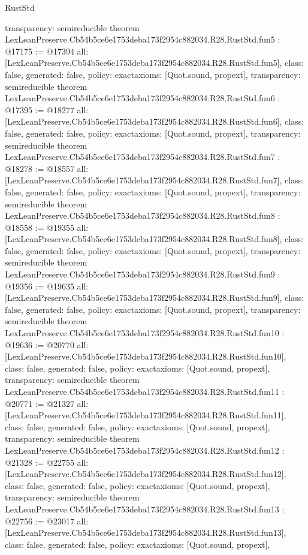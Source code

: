 \begin{lexlean}{RustStd}
\begin{coremodule}
{  transparency: semireducible
}
theorem LexLeanPreserve.Cb54b5ce6e1753deba173f2954c882034.R28.RustStd.fun5 : @17175 := @17394 {
  all: [LexLeanPreserve.Cb54b5ce6e1753deba173f2954c882034.R28.RustStd.fun5],
  class: false,
  generated: false,
  policy: exact{axioms: [Quot.sound, propext]},
  transparency: semireducible
}
theorem LexLeanPreserve.Cb54b5ce6e1753deba173f2954c882034.R28.RustStd.fun6 : @17395 := @18277 {
  all: [LexLeanPreserve.Cb54b5ce6e1753deba173f2954c882034.R28.RustStd.fun6],
  class: false,
  generated: false,
  policy: exact{axioms: [Quot.sound, propext]},
  transparency: semireducible
}
theorem LexLeanPreserve.Cb54b5ce6e1753deba173f2954c882034.R28.RustStd.fun7 : @18278 := @18557 {
  all: [LexLeanPreserve.Cb54b5ce6e1753deba173f2954c882034.R28.RustStd.fun7],
  class: false,
  generated: false,
  policy: exact{axioms: [Quot.sound, propext]},
  transparency: semireducible
}
theorem LexLeanPreserve.Cb54b5ce6e1753deba173f2954c882034.R28.RustStd.fun8 : @18558 := @19355 {
  all: [LexLeanPreserve.Cb54b5ce6e1753deba173f2954c882034.R28.RustStd.fun8],
  class: false,
  generated: false,
  policy: exact{axioms: [Quot.sound, propext]},
  transparency: semireducible
}
theorem LexLeanPreserve.Cb54b5ce6e1753deba173f2954c882034.R28.RustStd.fun9 : @19356 := @19635 {
  all: [LexLeanPreserve.Cb54b5ce6e1753deba173f2954c882034.R28.RustStd.fun9],
  class: false,
  generated: false,
  policy: exact{axioms: [Quot.sound, propext]},
  transparency: semireducible
}
theorem LexLeanPreserve.Cb54b5ce6e1753deba173f2954c882034.R28.RustStd.fun10 : @19636 := @20770 {
  all: [LexLeanPreserve.Cb54b5ce6e1753deba173f2954c882034.R28.RustStd.fun10],
  class: false,
  generated: false,
  policy: exact{axioms: [Quot.sound, propext]},
  transparency: semireducible
}
theorem LexLeanPreserve.Cb54b5ce6e1753deba173f2954c882034.R28.RustStd.fun11 : @20771 := @21327 {
  all: [LexLeanPreserve.Cb54b5ce6e1753deba173f2954c882034.R28.RustStd.fun11],
  class: false,
  generated: false,
  policy: exact{axioms: [Quot.sound, propext]},
  transparency: semireducible
}
theorem LexLeanPreserve.Cb54b5ce6e1753deba173f2954c882034.R28.RustStd.fun12 : @21328 := @22755 {
  all: [LexLeanPreserve.Cb54b5ce6e1753deba173f2954c882034.R28.RustStd.fun12],
  class: false,
  generated: false,
  policy: exact{axioms: [Quot.sound, propext]},
  transparency: semireducible
}
theorem LexLeanPreserve.Cb54b5ce6e1753deba173f2954c882034.R28.RustStd.fun13 : @22756 := @23017 {
  all: [LexLeanPreserve.Cb54b5ce6e1753deba173f2954c882034.R28.RustStd.fun13],
  class: false,
  generated: false,
  policy: exact{axioms: [Quot.sound, propext]},
}
\end{coremodule}
\end{lexlean}
